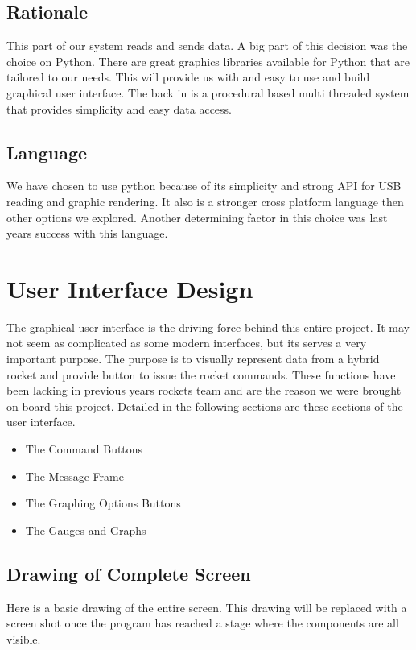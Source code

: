 \documentclass[10pt,draftclsnofoot,onecolumn,retainorgcmds]{IEEEtran}
\begin{document}
\subsection{Rationale}
This part of our system reads and sends data. A big part of this decision was the choice on Python. There are great graphics libraries available for Python that are tailored to our needs. This will provide us with and easy to use and build graphical user interface. The back in is a procedural based multi threaded system that provides simplicity and easy data access.
\subsection{Language}
We have chosen to use python because of its simplicity and strong API for USB reading and graphic rendering. It also is a stronger cross platform language then other options we explored. Another determining factor in this choice was last years success with this language.

\section{User Interface Design}
The graphical user interface is the driving force behind this entire project. It may not seem as complicated as some modern interfaces, but its serves a very important purpose. The purpose is to visually represent data from a hybrid rocket and provide button to issue the rocket commands. These functions have been lacking in previous years rockets team and are the reason we were brought on board this project. Detailed in the following sections are these sections of the user interface. \par

\begin{itemize}
	\item The Command Buttons
	\item The Message Frame
	\item The Graphing Options Buttons
	\item The Gauges and  Graphs
\end{itemize}

\subsection{Drawing of Complete Screen}
Here is a basic drawing of the entire screen. This drawing will be replaced with a screen shot once the program has reached a stage where the components are all visible.\par
\end{document}
